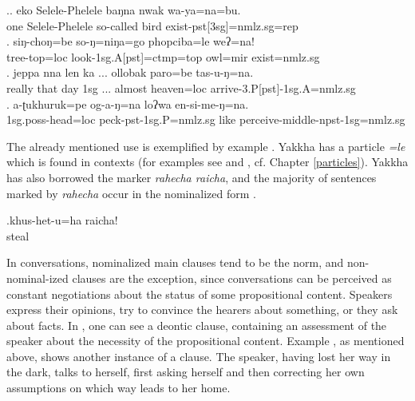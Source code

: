 \ex.\ag.  eko Selele-Phelele baŋna nwak wa-ya=na=bu.\\
one Selele-Phelele so-called bird exist{\sc -pst[3sg]=nmlz.sg=rep}\\
 
\bg. siŋ-choŋ=be        so-ŋ=niŋa=go              phopciba=le          weʔ=na!\\
tree-top{\sc =loc} look{\sc -1sg.A[pst]=ctmp=top} owl{\sc =mir} exist{\sc [3sg.npst]=nmlz.sg}\\
 
\bg. jeppa nna  len ka ... ollobak paro=be tas-u-ŋ=na.\\
really that day {\sc 1sg} ... almost heaven{\sc =loc} arrive{\sc -3.P[pst]-1sg.A=nmlz.sg}\\
 
\bg. a-ʈukhuruk=pe  og-a-ŋ=na loʔwa en-si-me-ŋ=na.\\
{\sc 1sg.poss-}head{\sc =loc} peck{\sc -pst-1sg.P=nmlz.sg} like perceive{\sc -middle-npst-1sg=nmlz.sg}\\
 


The already mentioned  use is exemplified by example \Next. Yakkha has a  particle \emph{=le} which is found in  contexts (for  examples see \Last[b] and \NNext[b], cf. Chapter \ref{particles}). Yakkha has also borrowed the   marker \emph{rahecha \ti raicha}, and the  majority of sentences marked by \emph{rahecha} occur in the nominalized form \Next.


\exg.khus-het-u=ha   raicha!\\
steal  \\
 

\largerpage
In conversations, nominalized main clauses tend to be  the norm, and non-nominal-ized clauses are the exception, since conversations can be perceived as constant negotiations about the status of some propositional content. Speakers express their opinions, try to convince the hearers about something, or they ask about facts. In \Next[a], one can see a deontic clause, containing an assessment of the speaker about the necessity of the propositional content. Example \Next[b], as mentioned above, shows another instance of a  clause. The speaker, having lost her way in the dark, talks to herself, first asking herself and then correcting her own assumptions on which way leads to her home. 


